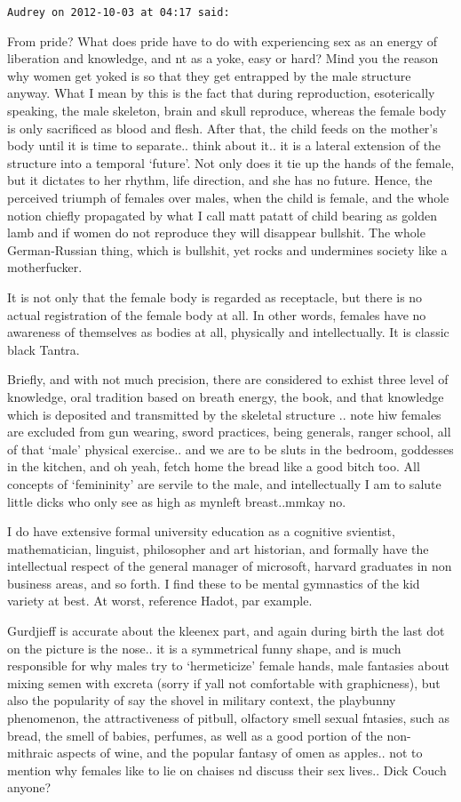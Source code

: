 \begin{footnotesize}
\begin{sffamily}
\texttt{Audrey on 2012-10-03 at 04:17 said: }

From pride? What does pride have to do with experiencing sex as an energy of liberation and knowledge, and nt as a yoke, easy or hard? Mind you the reason why women get yoked is so that they get entrapped by the male structure anyway. What I mean by this is the fact that during reproduction, esoterically speaking, the male skeleton, brain and skull reproduce, whereas the female body is only sacrificed as blood and flesh. After that, the child feeds on the mother's body until it is time to separate.. think about it.. it is a lateral extension of the structure into a temporal `future'. Not only does it tie up the hands of the female, but it dictates to her rhythm, life direction, and she has no future. Hence, the perceived triumph of females over males, when the child is female, and the whole notion chiefly propagated by what I call matt patatt of child bearing as golden lamb and if women do not reproduce they will disappear bullshit. The whole German-Russian thing, which is bullshit, yet rocks and undermines society like a motherfucker.

It is not only that the female body is regarded as receptacle, but there is no actual registration of the female body at all. In other words, females have no awareness of themselves as bodies at all, physically and intellectually. It is classic black Tantra.

Briefly, and with not much precision, there are considered to exhist three level of knowledge, oral tradition based on breath energy, the book, and that knowledge which is deposited and transmitted by the skeletal structure .. note hiw females are excluded from gun wearing, sword practices, being generals, ranger school, all of that `male' physical exercise.. and we are to be sluts in the bedroom, goddesses in the kitchen, and oh yeah, fetch home the bread like a good bitch too. All concepts of `femininity' are servile to the male, and intellectually I am to salute little dicks who only see as high as mynleft breast..mmkay no.

I do have extensive formal university education as a cognitive svientist, mathematician, linguist, philosopher and art historian, and formally have the intellectual respect of the general manager of microsoft, harvard graduates in non business areas, and so forth. I find these to be mental gymnastics of the kid variety at best. At worst, reference Hadot, par example.

Gurdjieff is accurate about the kleenex part, and again during birth the last dot on the picture is the nose.. it is a symmetrical funny shape, and is much responsible for why males try to `hermeticize' female hands, male fantasies about mixing semen with excreta (sorry if yall not comfortable with graphicness), but also the popularity of say the shovel in military context, the playbunny phenomenon, the attractiveness of pitbull, olfactory smell sexual fntasies, such as bread, the smell of babies, perfumes, as well as a good portion of the non-mithraic aspects of wine, and the popular fantasy of omen as apples.. not to mention why females like to lie on chaises nd discuss their sex lives.. Dick Couch anyone?


\end{sffamily}
\end{footnotesize}
